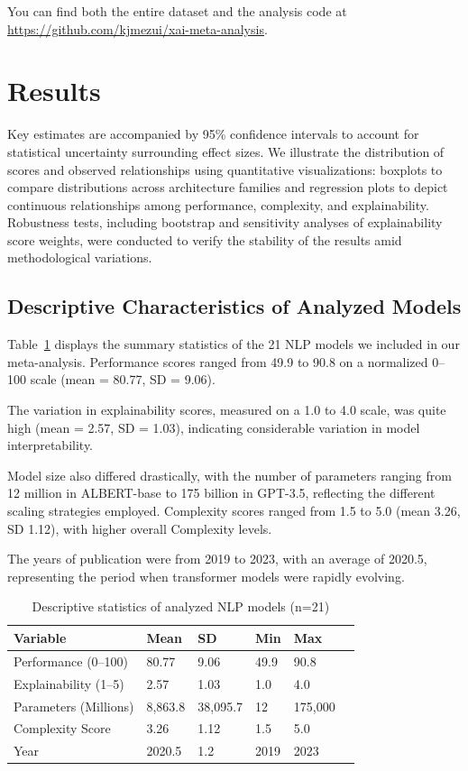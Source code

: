\documentclass[preprint,12pt]{elsarticle}
\begin{document}
You can find both the entire dataset and the analysis code at \url{https://github.com/kjmezui/xai-meta-analysis}.

\section{Results}
\label{sec:results}

Key estimates are accompanied by 95\% confidence intervals to account for statistical uncertainty surrounding effect sizes. We illustrate the distribution of scores and observed relationships using quantitative visualizations: boxplots to compare distributions across architecture families and regression plots to depict continuous relationships among performance, complexity, and explainability. Robustness tests, including bootstrap and sensitivity analyses of explainability score weights, were conducted to verify the stability of the results amid methodological variations.

\subsection{Descriptive Characteristics of Analyzed Models}
Table~\ref{tab:descriptive_stats} displays the summary statistics of the 21 NLP models we included in our meta-analysis. Performance scores ranged from 49.9 to 90.8 on a normalized 0--100 scale (mean = 80.77, SD = 9.06).

The variation in explainability scores, measured on a 1.0 to 4.0 scale, was quite high (mean = 2.57, SD = 1.03), indicating considerable variation in model interpretability.

Model size also differed drastically, with the number of parameters ranging from 12 million in ALBERT-base to 175 billion in GPT-3.5, reflecting the different scaling strategies employed. Complexity scores ranged from 1.5 to 5.0 (mean 3.26, SD 1.12), with higher overall Complexity levels.

The years of publication were from 2019 to 2023, with an average of 2020.5, representing the period when transformer models were rapidly evolving.

\begin{table}[ht!]
\centering
\caption{Descriptive statistics of analyzed NLP models (n=21)}
\label{tab:descriptive_stats}
\begin{tabularx}{\textwidth}{@{}l XXXXX @{}}
\toprule
\textbf{Variable} & \textbf{Mean} & \textbf{SD} & \textbf{Min} & \textbf{Max} \\
\midrule
Performance (0--100) & 80.77 & 9.06 & 49.9 & 90.8 \\
Explainability (1--5) & 2.57 & 1.03 & 1.0 & 4.0 \\
Parameters (Millions) & 8,863.8 & 38,095.7 & 12 & 175,000 \\
Complexity Score & 3.26 & 1.12 & 1.5 & 5.0 \\
Year & 2020.5 & 1.2 & 2019 & 2023 \\
\bottomrule
\end{tabularx}
\end{table}
\end{document}
